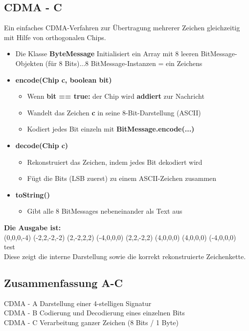 \subsection*{CDMA - C}
Ein einfaches CDMA-Verfahren zur Übertragung mehrerer Zeichen gleichzeitig mit Hilfe von orthogonalen Chips.
\begin{itemize}[itemsep=0pt]
   \item Die Klasse \textbf{ByteMessage} Initialisiert ein Array mit 8 leeren BitMessage-Objekten (für 8 Bits)...8 BitMessage-Instanzen = ein Zeichens 
   \item \textbf{encode(Chip c, boolean bit)}
   \begin{itemize}
    \item Wenn \textbf{bit == true:} der Chip wird \textbf{addiert} zur Nachricht
    \item Wandelt das Zeichen \textbf{c} in seine 8-Bit-Darstellung (ASCII)
    \item Kodiert jedes Bit einzeln mit \textbf{BitMessage.encode(...)}
   \end{itemize}
   \item \textbf{decode(Chip c)}
   \begin{itemize}
    \item Rekonstruiert das Zeichen, indem jedes Bit dekodiert wird
    \item Fügt die Bits (LSB zuerst) zu einem ASCII-Zeichen zusammen
   \end{itemize}
   \item \textbf{toString()}
   \begin{itemize}
    \item Gibt alle 8 BitMessages nebeneinander als Text aus
   \end{itemize}
\end{itemize}
\textbf{Die Ausgabe ist:}\\
(0,0,0,-4) (-2,2,-2,-2) (2,-2,2,2) (-4,0,0,0) (2,2,-2,2) (4,0,0,0) (4,0,0,0) (-4,0,0,0)\\
test\\
Diese zeigt die interne Darstellung sowie die korrekt rekonstruierte Zeichenkette.
\begin{codeblock}
    
\end{codeblock}

\subsection*{Zusammenfassung A-C}
CDMA - A \quad Darstellung einer 4-stelligen Signatur\\
CDMA - B \quad Codierung und Decodierung eines einzelnen Bits\\
CDMA - C \quad Verarbeitung ganzer Zeichen (8 Bits / 1 Byte)